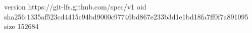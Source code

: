 version https://git-lfs.github.com/spec/v1
oid sha256:1335af523cd4415c94bd9000c97746bd867e233b3d1e1bd18fa7ff0f7a891095
size 152684
